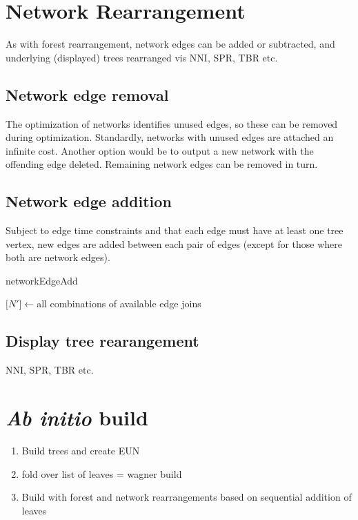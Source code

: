 \documentclass[11pt]{article}
\begin{document}
 \section{Network Rearrangement}\label{Network Rearrangement}
 As with forest rearrangement, network edges can be added or subtracted, and underlying (displayed) trees 
 rearranged vis NNI, SPR, TBR etc.
 
 \subsection{Network edge removal} \label{Network edge removal}
 The optimization of networks identifies unused edges, so these can be removed during optimization.  Standardly, networks with unused edges are attached an infinite cost.
 Another option would be to output a new network with the offending edge deleted.
 Remaining network edges can be removed in turn.
 
 \subsection{Network edge addition} \label{Network edge addition}
 Subject to edge time constraints and that each edge must have at least one tree vertex, new edges are added between each pair of edges (except for those where both are network edges).
 
 	\begin{algorithm}
		\caption{networkEdgeAdd}
		\label{alg:networkEdgeAdd}
		\SetAlgoLined
		$\lbrack N' \rbrack \leftarrow $all combinations of available edge joins\\
	\end{algorithm}
	
\subsection{Display tree rearangement}\label{Display tree rearangement}
NNI, SPR, TBR etc.
 
 \section{\textit{Ab initio} build}
 	\begin{enumerate}
		\item{Build trees and create EUN}
		\item{fold over list of leaves = wagner build}
		\item{Build with forest and network rearrangements based on sequential addition of leaves}
	\end{enumerate}
	
\end{document}
